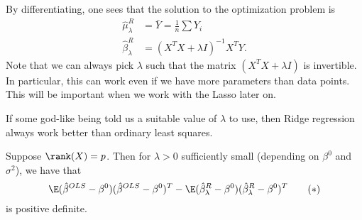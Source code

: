 \documentclass[a4paper]{article}
\begin{document}
By differentiating, one sees that the solution to the optimization problem is
\begin{align*}
  \hat{\mu}_\lambda^R &= \bar{Y} = \frac{1}{n} \sum Y_i\\
  \hat{\beta}^R_\lambda &= (X^T X + \lambda I)^{-1} X^T Y.
\end{align*}
Note that we can always pick $\lambda$ such that the matrix $(X^T X + \lambda I)$ is invertible. In particular, this can work even if we have more parameters than data points. This will be important when we work with the Lasso later on.

If some god-like being told us a suitable value of $\lambda$ to use, then Ridge regression always work better than ordinary least squares.
\begin{thm}
  Suppose $\rank(X) = p$. Then for $\lambda > 0$ sufficiently small (depending on $\beta^0$ and $\sigma^2$), we have that
  \[
    \E(\hat{\beta}^{OLS} - \beta^0)(\hat{\beta}^{OLS} - \beta^0)^T - \E(\hat{\beta}^{R}_\lambda - \beta^0)(\hat{\beta}^{R}_\lambda - \beta^0)^T \tag{$*$}
  \]
  is positive definite.
\end{thm}
\end{document}
